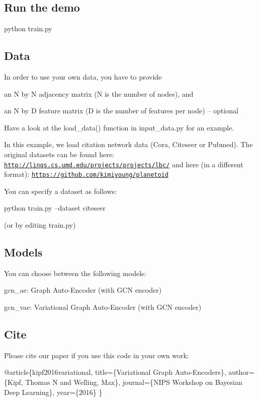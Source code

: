 \subsection*{Run the demo}


\begin{DoxyCode}
python train.py
\end{DoxyCode}


\subsection*{Data}

In order to use your own data, you have to provide
\begin{DoxyItemize}
\item an N by N adjacency matrix (N is the number of nodes), and
\item an N by D feature matrix (D is the number of features per node) -- optional
\end{DoxyItemize}

Have a look at the {\ttfamily load\+\_\+data()} function in {\ttfamily input\+\_\+data.\+py} for an example.

In this example, we load citation network data (Cora, Citeseer or Pubmed). The original datasets can be found here\+: \href{http://linqs.cs.umd.edu/projects/projects/lbc/}{\tt http\+://linqs.\+cs.\+umd.\+edu/projects/projects/lbc/} and here (in a different format)\+: \href{https://github.com/kimiyoung/planetoid}{\tt https\+://github.\+com/kimiyoung/planetoid}

You can specify a dataset as follows\+:


\begin{DoxyCode}
python train.py --dataset citeseer
\end{DoxyCode}


(or by editing {\ttfamily train.\+py})

\subsection*{Models}

You can choose between the following models\+:
\begin{DoxyItemize}
\item {\ttfamily gcn\+\_\+ae}\+: Graph Auto-\/\+Encoder (with G\+CN encoder)
\item {\ttfamily gcn\+\_\+vae}\+: Variational Graph Auto-\/\+Encoder (with G\+CN encoder)
\end{DoxyItemize}

\subsection*{Cite}

Please cite our paper if you use this code in your own work\+:


\begin{DoxyCode}
@article\{kipf2016variational,
  title=\{Variational Graph Auto-Encoders\},
  author=\{Kipf, Thomas N and Welling, Max\},
  journal=\{NIPS Workshop on Bayesian Deep Learning\},
  year=\{2016\}
\}
\end{DoxyCode}
 